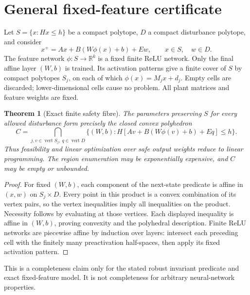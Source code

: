 \documentclass[11pt]{article}
\newtheorem{theorem}{Theorem}\newtheorem{proposition}{Proposition}
\begin{document}
\section{General fixed-feature certificate}
Let $S=\{x:Hx\le h\}$ be a compact polytope, $D$ a compact disturbance polytope, and consider
\[
 x^+=Ax+B(W\phi(x)+b)+Ew,\qquad x\in S,\quad w\in D.
\]
The feature network $\phi:S\to\mathbb R^k$ is a fixed finite ReLU network. Only the final affine layer $(W,b)$ is trained. Its activation patterns give a finite cover of $S$ by compact polytopes $S_j$, on each of which $\phi(x)=M_jx+d_j$. Empty cells are discarded; lower-dimensional cells cause no problem. All plant matrices and feature weights are fixed.
\begin{theorem}[Exact finite safety fibre]
The parameters preserving $S$ for every allowed disturbance form precisely the closed convex polyhedron
\[
 C=\bigcap_{j,v\in\operatorname{vert}S_j,\ q\in\operatorname{vert}D}
 \{(W,b):H[Av+B(W\phi(v)+b)+Eq]\le h\}.
\]
Thus feasibility and linear optimization over safe output weights reduce to linear programming. The region enumeration may be exponentially expensive, and $C$ may be empty or unbounded.
\end{theorem}
\begin{proof}
For fixed $(W,b)$, each component of the next-state predicate is affine in $(x,w)$ on $S_j\times D$. Every point in this product is a convex combination of its vertex pairs, so the vertex inequalities imply all inequalities on the product. Necessity follows by evaluating at those vertices. Each displayed inequality is affine in $(W,b)$, proving convexity and the polyhedral description. Finite ReLU networks are piecewise affine by induction over layers: intersect each preceding cell with the finitely many preactivation half-spaces, then apply its fixed activation pattern.
\end{proof}
This is a completeness claim only for the stated robust invariant predicate and exact fixed-feature model. It is not completeness for arbitrary neural-network properties.
\end{document}

